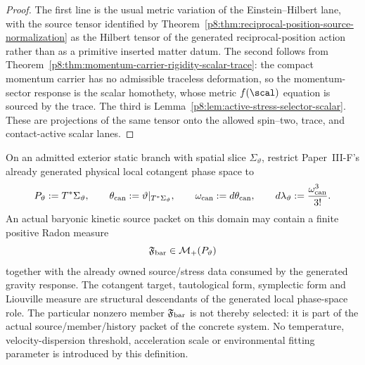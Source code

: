 \documentclass[12pt,a4paper]{article}
\begin{document}
\begin{proof}
The first line is the usual metric variation of the Einstein--Hilbert lane, with the source tensor identified by Theorem~\ref{p8:thm:reciprocal-position-source-normalization} as the Hilbert tensor of the generated reciprocal-position action rather than as a primitive inserted matter datum.  The second follows from Theorem~\ref{p8:thm:momentum-carrier-rigidity-scalar-trace}: the compact momentum carrier has no admissible traceless deformation, so the momentum-sector response is the scalar homothety, whose metric \(f(\scal)\) equation is sourced by the trace.  The third is Lemma~\ref{p8:lem:active-stress-selector-scalar}.  These are projections of the same tensor onto the allowed spin--two, trace, and contact-active scalar lanes.
\end{proof}


\begin{definition}
\label{p8:def:v2127-kinetic-baryon-source-packet}
On an admitted exterior static branch with spatial slice
$\Sigma_\vartheta$, restrict Paper~III-F's already generated physical local
cotangent phase space to
\begin{equation}
 P_\vartheta:=T^*\Sigma_\vartheta,
 \qquad
 \theta_{\rm can}:=\vartheta|_{T^*\Sigma_\vartheta},
 \qquad
 \omega_{\rm can}:=d\theta_{\rm can},
 \qquad
 d\lambda_\vartheta:=\frac{\omega_{\rm can}^3}{3!}.
\label{p8:eq:v2127-liouville-measure}
\end{equation}
An actual baryonic kinetic source packet on this domain may contain a finite
positive Radon measure
\begin{equation}
 \mathfrak F_{\rm bar}\in\mathcal M_+(P_\vartheta)
\label{p8:eq:v2127-baryon-kinetic-measure}
\end{equation}
together with the already owned source/stress data consumed by the generated
gravity response.  The cotangent target, tautological form, symplectic form
and Liouville measure are structural descendants of the generated local
phase-space role.  The particular nonzero member $\mathfrak F_{\rm bar}$ is
not thereby selected: it is part of the actual source/member/history packet
of the concrete system.  No temperature, velocity-dispersion threshold,
acceleration scale or environmental fitting parameter is introduced by this
definition.
\end{definition}
\end{document}
